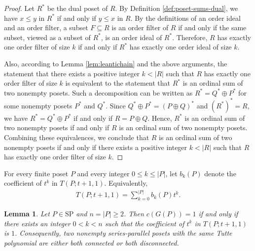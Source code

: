 \documentclass[11pt,a4paper]{article}
\newtheorem{lemma}[theorem]{Lemma}
\begin{document}
\begin{proof}
Let $R^*$ be the dual poset of $R$. By Definition \ref{def:poset-sums-dual}, 
we have $x\le y$ in $R^*$ if and only if $y\le x$ in $R$.
By the definitions of an order ideal and an order filter,
a subset $F\subseteq R$ is an order filter of $R$
if and only if the same subset, viewed as a subset of $R^*$,
is an order ideal of $R^*$.
Therefore, $R$ has exactly one order filter of size $k$
if and only if $R^*$ has exactly one order ideal of size $k$.

Also, according to Lemma \ref{lem:leantichain} and the above arguments, 
the statement that there exists a positive integer $k<|R|$ such that 
$R$ has exactly one order filter of size $k$ is equivalent to 
the statement that $R^*$ is an ordinal sum of two nonempty posets.
Such a decomposition can be written as $R^*=Q^*\oplus P^*$ 
for some nonempty posets $P^*$ and $Q^*$.
Since $Q^*\oplus P^*=(P\oplus Q)^*$ and $(R^*)^*=R$,
we have $R^*=Q^*\oplus P^*$ if and only if $R=P\oplus Q$.
Hence, $R^*$ is an ordinal sum of two nonempty posets
if and only if $R$ is an ordinal sum of two nonempty posets.
Combining these equivalences, we conclude that $R$ is an ordinal sum
of two nonempty posets if and only if there exists a positive integer
$k<|R|$ such that $R$ has exactly one order filter of size $k$.
\end{proof}

For every finite poset $P$ and every integer
$0\leq k\leq |P|$, let $b_k(P)$ denote the coefficient of
$t^k$ in $T(P;t+1,1)$. Equivalently,
\begin{eqnarray*}
T(P;t+1,1)=\sum_{k=0}^{|P|}b_k(P)t^k.
\end{eqnarray*}

\begin{lemma}\label{lem:connectivity}
Let $P\in\mathrm{SP}$ and $n=|P|\geq 2$.
Then $c(G(P))=1$ if and only if there exists an integer
$0<k<n$ such that the coefficient of $t^k$ in $T(P;t+1,1)$
is $1$.
Consequently, two nonempty series-parallel posets with the same
Tutte polynomial are either both connected or both disconnected.
\end{lemma}
\end{document}
